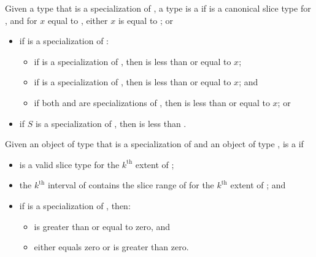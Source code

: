 \pnum
Given a type  that is a specialization of ,
a type  is a
if  is a canonical slice type for , and
for $x$ equal to ,
either $x$ is equal to ; or
\begin{itemize}
\item
  if  is a specialization of :
  \begin{itemize}
  \item
    if  is a specialization of ,
    then  is less than or equal to $x$;
  \item
    if  is a specialization of ,
    then  is less than or equal to $x$; and
  \item
    if both  and 
    are specializations of ,
    then 
    is less than or equal to $x$; or
  \end{itemize}
\item
  if $S$ is a specialization of ,
  then  is less than .
\end{itemize}

\pnum
Given an object  of type 
that is a specialization of  and
an object  of type ,
 is a
if
\begin{itemize}
\item
   is a valid  slice type for the $k^\text{th}$ extent of ;
\item
  the $k^\text{th}$ interval of 
  contains the  slice range of 
  for the $k^\text{th}$ extent of ; and
\item
  if  is a specialization of , then:
  \begin{itemize}
  \item {} is greater than or equal to zero, and
  \item either  equals zero or  is greater than zero.
  \end{itemize}
\end{itemize}

